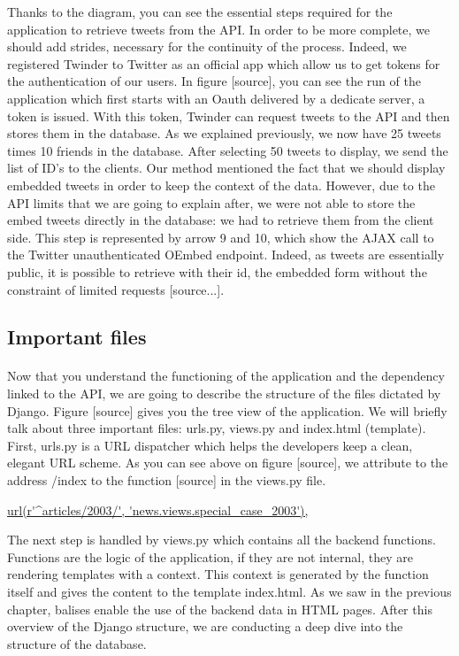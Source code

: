 Thanks to the diagram, you can see the essential steps required for the application to retrieve tweets from the API. In order to be more complete, we should add strides, necessary for the continuity of the process. Indeed, we registered Twinder to Twitter as an official app which allow us to get tokens for the authentication of our users. In figure [source], you can see the run of the application which first starts with an Oauth delivered by a dedicate server, a token is issued. With this token, Twinder can request tweets to the API and then stores them in the database. As we explained previously, we now have 25 tweets times 10 friends in the database. After selecting 50 tweets to display, we send the list of ID's to the clients. Our method mentioned the fact that we should display embedded tweets in order to keep the context of the data. However, due to the API limits that we are going to explain after, we were not able to store the embed tweets directly in the database: we had to retrieve them from the client side. This step is represented by arrow 9 and 10, which show the AJAX call to the Twitter unauthenticated OEmbed endpoint. Indeed, as tweets are essentially public, it is possible to retrieve with their id, the embedded form without the constraint  of limited requests [source...].\\

\subsection{Important files}

\paragraph{}
Now that you understand the functioning of the application and the dependency linked to the API, we are going to describe the structure of the files dictated by Django. Figure [source] gives you the tree view of the application. We will briefly talk about three important files: urls.py, views.py and index.html (template). First, urls.py is a URL dispatcher which helps the developers keep a clean, elegant URL scheme. As you can see above on figure [source], we attribute to the address /index to the function [source] in the views.py file. 

   \url{url(r'^articles/2003/', 'news.views.special_case_2003'),}

The next step is handled by views.py which contains all the backend functions. Functions are the logic of the application, if they are not internal, they are rendering templates with a context. This context is generated by the function itself and gives the content to the template index.html. As we saw in the previous chapter, balises enable the use of the backend data in HTML pages. After this overview of the Django structure, we are conducting a deep dive into the structure of the database.


